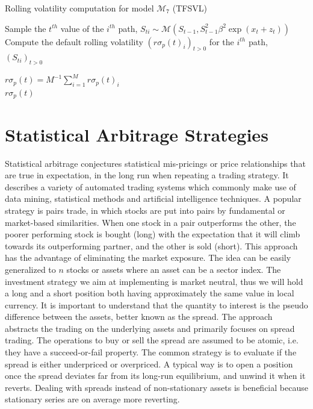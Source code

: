 \documentclass[11pt,a4,twosided,singlespacing,titlepagenumber=on]{scrreprt}
\numberwithin{equation}{chapter} %
\theoremstyle{remark}
\begin{document}
\begin{algorithm}
\caption{Rolling volatility computation for model $\mathcal{M}_7$ (TFSVL)}
\label{rolling_volatility_algo}
\begin{algorithmic}[1]

		\State Sample the $t^{th}$ value of the $i^{th}$ path, $S_{ti} \sim \mathcal{M}(S_{t-1}, S_{t-1}^2 \beta^2 \exp(x_t + z_t))$
	\State Compute the default rolling volatility $(r\sigma_p(t)_i)_{t>0}$ for the $i^{th}$ path, $(S_{ti})_{t>0}$

	\State $\displaystyle{r\sigma_p(t) = M^{-1} \sum_{i=1}^M r\sigma_p(t)_i}$
\\
\Return $r\sigma_p(t)$
\EndProcedure
\end{algorithmic}
\end{algorithm}

\chapter{Statistical Arbitrage Strategies}
Statistical arbitrage conjectures statistical mis-pricings or price relationships that are true in expectation, in the long run when repeating a trading strategy. It describes a variety of automated trading systems which commonly make use of data mining, statistical methods and artificial intelligence techniques. A popular strategy is pairs trade, in which stocks are put into pairs by fundamental or market-based similarities. When one stock in a pair outperforms the other, the poorer performing stock is bought (long) with the expectation that it will climb towards its outperforming partner, and the other is sold (short). This approach has the advantage of eliminating the market exposure. The idea can be easily generalized to $n$ stocks or assets where an asset can be a sector index. The investment strategy we aim at implementing is market neutral, thus we will hold a long and a short position both having approximately the same value in local currency. It is important to understand that the quantity to interest is the pseudo difference between the assets, better known as the spread. The approach abstracts the trading on the underlying assets and primarily focuses on spread trading. The operations to buy or sell the spread are assumed to be atomic, i.e. they have a succeed-or-fail property. The common strategy is to evaluate if the spread is either underpriced or overpriced. A typical way is to open a position once the spread deviates far from its long-run equilibrium, and unwind it when it reverts. Dealing with spreads instead of non-stationary assets is beneficial because stationary series are on average more reverting. \\
\end{document}
